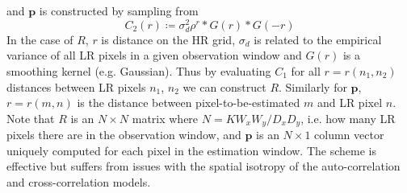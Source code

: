and $\bm{p}$ is constructed by sampling from
\begin{equation}
    C_2(r) \coloneqq \sigma_d^2 \rho^{r} \ast G(r) \ast G(-r)
\end{equation}
In the case of $R$, $r$ is distance on the HR grid, $\sigma_d$ is related to the empirical variance of all LR pixels in a given observation window and $G(r)$ is a smoothing kernel (e.g. Gaussian).
%
Thus by evaluating $C_1$ for all $r = r(n_1, n_2)$ distances between LR pixels $n_1$, $n_2$ we can construct $R$.
%
Similarly for $\bm{p}$, $r = r(m, n)$ is the distance between pixel-to-be-estimated $m$ and LR pixel $n$.
%
Note that $R$ is an $N \times N$ matrix where $N = K W_x W_y/D_x D_y$, i.e. how many LR pixels there are in the observation window, and $\bm{p}$ is an $N \times 1$ column vector uniquely computed for each pixel in the estimation window.
%
The scheme is effective but suffers from issues with the spatial isotropy of the auto-correlation and cross-correlation models.

